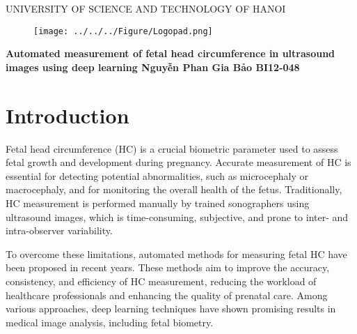 \documentclass[14pt]{extreport}
\begin{document}
\begin{titlepage}
    \begin{center}
        \begin{adjustwidth}{-100pt}{-100pt}
            \centering
            {\fontsize{20}{15}\selectfont UNIVERSITY OF SCIENCE AND TECHNOLOGY OF HANOI}
            \vspace{1cm}

            \begin{figure}[H]
                \texttt{[image: ../../../Figure/Logopad.png]}
            \end{figure}
            \vspace{2cm}
        \end{adjustwidth}
        \linespread{1}\LARGE \bfseries Automated measurement of fetal head circumference in ultrasound images using deep learning
        \newline
        \vspace{4cm}
        \textbf{\Large Nguyễn Phan Gia Bảo}
        \newline
        \vspace{1cm}
        \textbf{\Large BI12-048}
        \date{}
    \end{center}
\end{titlepage}


\begingroup\singlespacing
\tableofcontents
\endgroup
\clearpage


\chapter{Introduction}
Fetal head circumference (HC) is a crucial biometric parameter used to assess fetal growth and development during pregnancy. Accurate measurement of HC is essential for detecting potential abnormalities, such as microcephaly or macrocephaly, and for monitoring the overall health of the fetus. Traditionally, HC measurement is performed manually by trained sonographers using ultrasound images, which is time-consuming, subjective, and prone to inter- and intra-observer variability.

To overcome these limitations, automated methods for measuring fetal HC have been proposed in recent years. These methods aim to improve the accuracy, consistency, and efficiency of HC measurement, reducing the workload of healthcare professionals and enhancing the quality of prenatal care. Among various approaches, deep learning techniques have shown promising results in medical image analysis, including fetal biometry.
\end{document}
